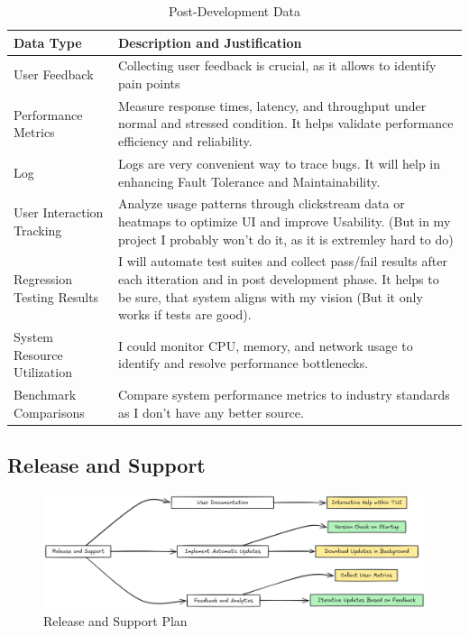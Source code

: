 \documentclass[10pt , a4paper]{report}
\begin{document}
\begin{table}[h!tbp]
\centering
\renewcommand{\arraystretch}{1.3} %
\begin{tabular}{|l|p{10cm}|}
\hline
\textbf{Data Type} & \textbf{Description and Justification} \\ \hline
User Feedback & Collecting user feedback is crucial, as it allows to identify pain points  \\ \hline
Performance Metrics & Measure response times, latency, and throughput under normal and stressed condition. It helps validate performance efficiency and reliability. \\ \hline
Log & Logs are very convenient way to trace bugs. It will help in enhancing Fault Tolerance and Maintainability. \\ \hline
User Interaction Tracking & Analyze usage patterns through clickstream data or heatmaps to optimize UI and improve Usability. (But in my project I probably won't do it, as it is extremley hard to do) \\ \hline
Regression Testing Results & I will automate test suites and collect pass/fail results after each itteration and in post development phase. It helps to be sure, that system aligns with my vision (But it only works if tests are good). \\ \hline
System Resource Utilization & I could monitor CPU, memory, and network usage to identify and resolve performance bottlenecks. \\ \hline
Benchmark Comparisons & Compare system performance metrics to industry standards as I don't have any better source. \\ \hline

\end{tabular}
\caption{Post-Development Data}
\label{tab:post_dev_data}
\end{table}

\newpage
\subsection{Release and Support}
\begin{figure}[htbp]
    \centering
    \includegraphics[width=1\linewidth]{imgs/ReleaseSupportDiagram.png}
    \caption{Release and Support Plan}
    \label{fig:release_support}
\end{figure}
\end{document}
